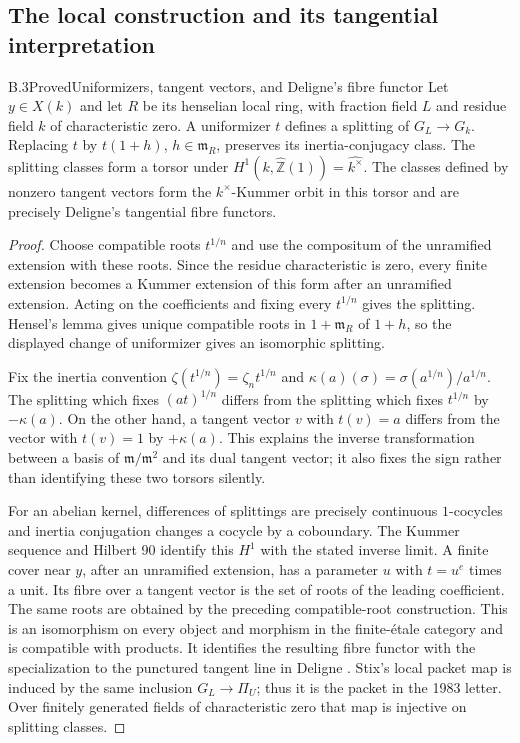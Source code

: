 \subsection{The local construction and its tangential interpretation}

\begin{statement}{B.3}{Proved}{Uniformizers, tangent vectors, and Deligne's fibre functor}
Let $y\in X(k)$ and let $R$ be its henselian local ring, with fraction
field $L$ and residue field $k$ of characteristic zero.  A uniformizer
$t$ defines a splitting of $G_L\to G_k$.  Replacing $t$ by $t(1+h)$,
$h\in\mathfrak m_R$, preserves its inertia-conjugacy class.  The
splitting classes form a torsor under
$H^1(k,\widehat{\mathbb Z}(1))=\widehat{k^\times}$.
The classes defined by nonzero tangent vectors form the
$k^\times$-Kummer orbit in this torsor and are precisely Deligne's
tangential fibre functors.
\end{statement}
\begin{proof}
Choose compatible roots $t^{1/n}$ and use the compositum of the
unramified extension with these roots.  Since the residue characteristic
is zero, every finite extension becomes a Kummer extension of this
form after an unramified extension.  Acting on the coefficients and
fixing every $t^{1/n}$ gives the splitting.  Hensel's lemma gives unique
compatible roots in $1+\mathfrak m_R$ of $1+h$, so the displayed change
of uniformizer gives an isomorphic splitting.

Fix the inertia convention
$\zeta(t^{1/n})=\zeta_n t^{1/n}$ and
$\kappa(a)(\sigma)=\sigma(a^{1/n})/a^{1/n}$.
The splitting which fixes $(at)^{1/n}$ differs from the splitting which
fixes $t^{1/n}$ by $-\kappa(a)$.  On the other hand, a tangent vector $v$
with $t(v)=a$ differs from the vector with $t(v)=1$ by $+\kappa(a)$.
This explains the inverse transformation between a basis of
$\mathfrak m/\mathfrak m^2$ and its dual tangent vector; it also fixes
the sign rather than identifying these two torsors silently.

For an abelian kernel, differences of splittings are precisely continuous
$1$-cocycles and inertia conjugation changes a cocycle by a coboundary.
The Kummer sequence and Hilbert 90 identify this $H^1$ with the stated
inverse limit.  A finite cover near $y$, after an unramified extension,
has a parameter $u$ with $t=u^e$ times a unit.  Its fibre over a tangent
vector is the set of roots of the leading coefficient.  The same roots
are obtained by the preceding compatible-root construction.  This is
an isomorphism on every object and morphism in the finite-\'etale
category and is compatible with products.  It identifies the resulting
fibre functor with the specialization to the punctured tangent line
in Deligne \cite[\S15.13--15.26]{B_Deligne}.
Stix's local packet map \cite[Proposition 8 and Theorem 14]{B_StixCuspidal}
is induced by the same inclusion $G_L\to\Pi_U$; thus it is the packet
in the 1983 letter.  Over finitely generated fields of characteristic
zero that map is injective on splitting classes.
\end{proof}

